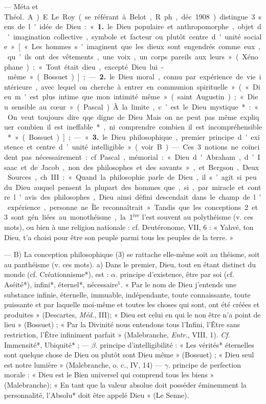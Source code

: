 \begin{itemize}[leftmargin=1cm, label=, itemsep=1pt]
 — Méta et \si{Théol.} A) E. Le Roy
(se référant à Belot, R. ph., déc.1908)
distingue 3 sens de l'idée de Dieu :
« {\bf 1.} le Dieu populaire et anthropomorphe, objet d'imagination collective, symbole et facteur ou plutôt
centre d'unité sociale» [« Les hommes
s'imaginent que les dieux sont engendrés comme eux, qu'ils ont des
vêtements, une voix, un corps
pareils aux leurs » (Xénophane);
« Tout était dieu, excepté Dieu lui-même » (Bossuet)]; — {\bf 2.} le Dieu
moral, connu par expérience de vie
intérieure, avec lequel on cherche à
entrer en communion spirituelle »
(« Dieu m'est plus intime que mon
intimité même » (saint Augustin);
« Dieu sensible au cœur » (Pascal).
À la limite, c’est le Dieu mystique* :
« On veut toujours dire qqe. digne
de Dieu... Mais on ne peut pas même
expliquer combien il est ineffable*,
ni comprendre combien il est incompréhensible* » (Bossuet)]; —
« {\bf 3.} le Dieu philosophique, premier
principe d’existence et centre d’unité
intelligible » (voir B). — Ces 3 notions ne coïncident pas nécessairement : cf. Pascal, mémorial : « Dieu
d'Abraham, d’Isaac et de Jacob,
non des philosophes et des savants »,
et Bergson, Deux Sources, ch. III :
« Quand la philosophie parle de
Dieu,... il s’agit si peu du Dieu
auquel pensent la plupart des
hommes que, si, par miracle et
contre l'avis des philosophes, Dieu
ainsi défini descendait dans le champ
de l'expérience, personne ne Île
reconnaîtrait. » Tandis que les conceptions 2 et 3 sont gén. liées au
monothéisme, la 1$^\text{ère}$ l’est souvent au
polythéisme (v. ces mots), ou bien à
une religion nationale : cf. Deutéronome, VII, 6 : « Yahvé, ton Dieu,
t'a choisi pour être son peuple parmi
tous les peuples de la terre. »

— B) La conception philosophique (3) se rattache elle-même
soit au théisme, soit au panthéisme
(v. ces mots). a) Dans le premier,
Dieu, tout en étant distinct du
monde (cf. Créationnisme*), est :
$\alpha$. principe d'existence, être par soi
(cf. Aséité*), infini*, éternel*, nécessaire$^1$. « Par le nom de Dieu j’entends une substance infinie, éternelle, immuable, indépendante,
toute connaissante, toute puissante
et par laquelle moi-même et toutes
les choses qui sont, ont été créées et
produites » (Descartes, \si{{\it Méd.}}, III);
« Dieu est celui en qui le non être
n’a point de lieu » (Bossuet) ; « Par
la Divinité nous entendons tous
l'Infini, l’Être sans restriction, l'Être
infiniment parfait » (Malebranche,
{\it Entr.}, VIII, 1). {\it Cf.} Immensité*,
Ubiquité* ; — $\beta$. principe d'intelligibilité : « Les vérités* éternelles
sont quelque chose de Dieu ou
plutôt sont Dieu même » (Bossuet) ;
« Dieu seul est notre lumière » (Malebranche, o. c., IV, 14) — $\gamma$. principe
de perfection morale : « Dieu est le
Bien universel qui comprend tous
les biens » (Malebranche); « En tant
que la valeur absolue doit posséder
éminemment la personnalité, l’Absolu*
doit être appelé Dieu » (Le
Senne).


\end{itemize}
